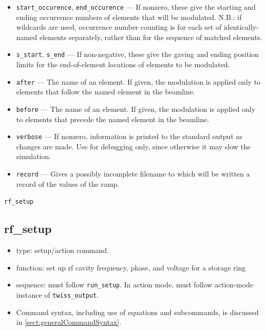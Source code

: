 \documentclass[11pt]{article}
\begin{document}
\begin{itemize}
  \begin{itemize}
    \item \verb|differential=1|, \verb|multiplicative=0|: $v(t) = v_0 + R(i)$ (default).
    \item \verb|differential=0|, \verb|multiplicative=0|: $v(t) = R(i)$.  
    \item \verb|differential=1|, \verb|multiplicative=1|: $v(t) = v_0 + v_0 R(i)$.  
    \item \verb|differential=0|, \verb|multiplicative=1|: $v(t) = v_0 R(i)$.  
  \end{itemize}
\item \verb|start_occurence|, \verb|end_occurence| --- If nonzero, these give the starting and
 ending occurrence numbers of elements that will be modulated. N.B.: if wildcards are used, occurrence
 number counting is for each set of identically-named elements separately, rather than for the sequence
 of matched elements.
\item \verb|s_start|, \verb|s_end| --- If non-negative, these give the gaving and ending position
 limits for the end-of-element locations of elements to be modulated.
\item \verb|after| --- The name of an element.  If given, the modulation is applied only to elements
 that follow the named element in the beamline.  
\item \verb|before| --- The name of an element.  If given, the modulation is applied only to elements
 that precede the named element in the beamline. 
\item \verb|verbose| --- If nonzero, information is printed to the standard output as changes are
        made.  Use for debugging only, since otherwise it may slow the simulation.
\item \verb|record| --- Gives a possibly incomplete filename to which will be written a record of the values of
  the ramp.
\end{itemize}

\newpage
\begin{center}{\Large\verb|rf_setup|}\end{center}
\subsection{rf\_setup\label{subsec:rfsetup}}

\begin{itemize}
\item type: setup/action command.
\item function: set up rf cavity frequency, phase, and voltage for a storage ring
\item sequence: must follow \verb|run_setup|. In action mode, must follow action-mode instance of \verb|twiss_output|.
\item Command syntax, including use of equations and subcommands, is discussed in \ref{sect:generalCommandSyntax}.
\end{itemize}
\end{document}
